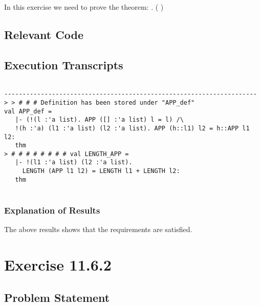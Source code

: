 \documentclass{report}
\begin{document}
In this exercise we need to prove the theorem:
\HOLTokenTurnstile{} \HOLSymConst{\HOLTokenForall{}} .  (  ) \HOLSymConst{=}   \HOLSymConst{+}  

\section{Relevant Code}
\label{sec:relevant-code-1}


\section{Execution Transcripts}
\label{sec:exec-transcr-1}

\setcounter{sessioncount}{0}
\begin{session}
  \begin{scriptsize}
\begin{verbatim}

---------------------------------------------------------------------
> > # # # Definition has been stored under "APP_def"
val APP_def =
   |- (!(l :'a list). APP ([] :'a list) l = l) /\
   !(h :'a) (l1 :'a list) (l2 :'a list). APP (h::l1) l2 = h::APP l1 l2:
   thm
> # # # # # # # # val LENGTH_APP =
   |- !(l1 :'a list) (l2 :'a list).
     LENGTH (APP l1 l2) = LENGTH l1 + LENGTH l2:
   thm
 
\end{verbatim}
  \end{scriptsize}
\end{session}

\subsection{Explanation of Results}
\label{sec:explanation-results-1}
The above results shows that the requirements are satisfied.


 \chapter{Exercise 11.6.2}
 \label{cha:exercise-11.6.2}
  
 \section{Problem Statement}
 \label{sec:problem-statement-2}
\end{document}
